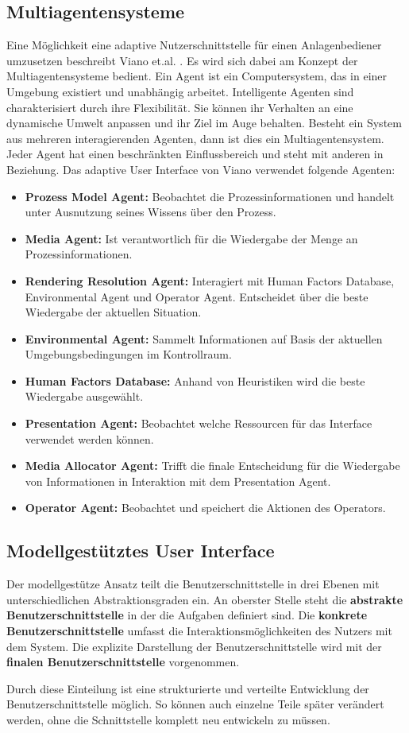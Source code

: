 \subsection{Multiagentensysteme}
Eine Möglichkeit eine adaptive Nutzerschnittstelle für einen Anlagenbediener umzusetzen beschreibt Viano et.al. \cite{Viano2000}. Es wird sich dabei am Konzept der Multiagentensysteme bedient. Ein Agent ist ein Computersystem, das in einer Umgebung existiert und unabhängig arbeitet. Intelligente Agenten sind charakterisiert durch ihre Flexibilität. Sie können ihr Verhalten an eine dynamische Umwelt anpassen und ihr Ziel im Auge behalten. Besteht ein System aus mehreren interagierenden Agenten, dann ist dies ein Multiagentensystem. Jeder Agent hat einen beschränkten Einflussbereich und steht mit anderen in Beziehung. Das adaptive User Interface von Viano \cite{Viano2000} verwendet folgende Agenten:
\begin{itemize}
\item \textbf{Prozess Model Agent:} Beobachtet die Prozessinformationen und handelt unter Ausnutzung seines Wissens über den Prozess.
\item \textbf{Media Agent:} Ist verantwortlich für die Wiedergabe der Menge an Prozessinformationen.
\item \textbf{Rendering Resolution Agent:} Interagiert mit Human Factors Database, Environmental Agent und Operator Agent. Entscheidet über die beste Wiedergabe der aktuellen Situation.
\item \textbf{Environmental Agent:} Sammelt Informationen auf Basis der aktuellen Umgebungsbedingungen im Kontrollraum.
\item \textbf{Human Factors Database:} Anhand von Heuristiken wird die beste Wiedergabe ausgewählt.
\item \textbf{Presentation Agent:} Beobachtet welche Ressourcen für das Interface verwendet werden können.
\item \textbf{Media Allocator Agent:} Trifft die finale Entscheidung für die Wiedergabe von Informationen in Interaktion mit dem Presentation Agent.
\item \textbf{Operator Agent:} Beobachtet und speichert die Aktionen des Operators.
\end{itemize}

\subsection{Modellgestütztes User Interface}
Der modellgestütze Ansatz teilt die Benutzerschnittstelle in drei Ebenen mit unterschiedlichen Abstraktionsgraden ein. An oberster Stelle steht die \textbf{abstrakte Benutzerschnittstelle} in der die Aufgaben definiert sind. Die \textbf{konkrete Benutzerschnittstelle} umfasst die Interaktionsmöglichkeiten des Nutzers mit dem System. Die explizite Darstellung der Benutzerschnittstelle wird mit der \textbf{finalen Benutzerschnittstelle} vorgenommen. \cite{Meixner2011, Park2015}

Durch diese Einteilung ist eine strukturierte und verteilte Entwicklung der Benutzerschnittstelle möglich. So können auch einzelne Teile später verändert werden, ohne die Schnittstelle komplett neu entwickeln zu müssen. \cite{Meixner2011}

